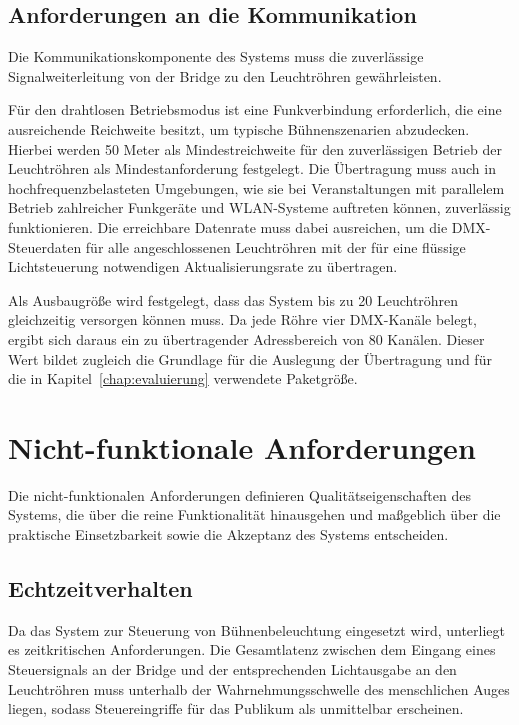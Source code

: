 \subsection{Anforderungen an die Kommunikation}
\label{subsec:fa-kommunikation}

Die Kommunikationskomponente des Systems muss die zuverlässige
Signalweiterleitung von der Bridge zu den Leuchtröhren gewährleisten.

Für den drahtlosen Betriebsmodus ist eine Funkverbindung erforderlich, die
eine ausreichende Reichweite besitzt, um typische Bühnenszenarien abzudecken.
Hierbei werden 50 Meter als Mindestreichweite für den zuverlässigen Betrieb 
der Leuchtröhren als Mindestanforderung festgelegt.
Die Übertragung muss auch in hochfrequenzbelasteten Umgebungen, wie sie bei
Veranstaltungen mit parallelem Betrieb zahlreicher Funkgeräte und WLAN-Systeme
auftreten können, zuverlässig funktionieren. Die erreichbare Datenrate muss
dabei ausreichen, um die DMX-Steuerdaten für alle angeschlossenen Leuchtröhren
mit der für eine flüssige Lichtsteuerung notwendigen Aktualisierungsrate zu
übertragen.

Als Ausbaugröße wird festgelegt, dass das System bis zu 20 Leuchtröhren gleichzeitig
versorgen können muss. Da jede Röhre vier DMX-Kanäle belegt, ergibt sich daraus ein zu
übertragender Adressbereich von 80 Kanälen. Dieser Wert bildet zugleich die Grundlage
für die Auslegung der Übertragung und für die in Kapitel~\ref{chap:evaluierung}
verwendete Paketgröße.

\section{Nicht-funktionale Anforderungen}
\label{sec:nicht-funktionale-anforderungen}

Die nicht-funktionalen Anforderungen definieren Qualitätseigenschaften des
Systems, die über die reine Funktionalität hinausgehen und maßgeblich über
die praktische Einsetzbarkeit sowie die Akzeptanz des Systems entscheiden.

\subsection{Echtzeitverhalten}
\label{subsec:echtzeitverhalten}

Da das System zur Steuerung von Bühnenbeleuchtung eingesetzt wird, unterliegt
es zeitkritischen Anforderungen. Die Gesamtlatenz zwischen dem Eingang eines
Steuersignals an der Bridge und der entsprechenden Lichtausgabe an den
Leuchtröhren muss unterhalb der Wahrnehmungsschwelle des menschlichen Auges
liegen, sodass Steuereingriffe für das Publikum als unmittelbar erscheinen.

